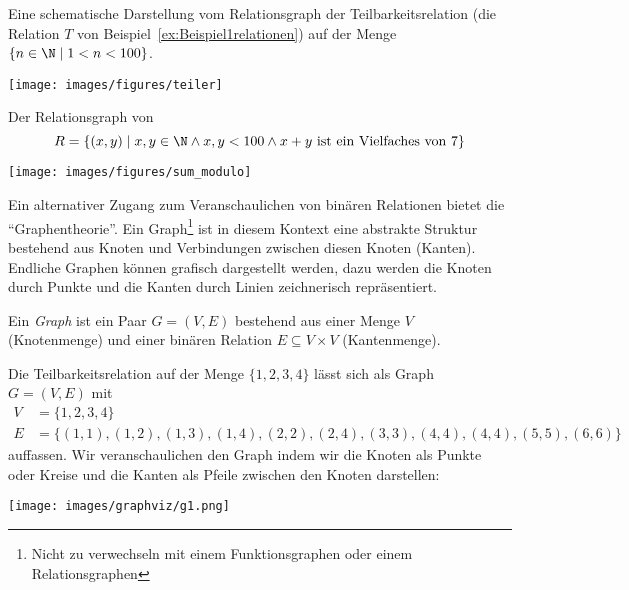 \begin{bsp}
Eine schematische Darstellung vom Relationsgraph der Teilbarkeitsrelation (die Relation
$T$ von Beispiel~\ref{ex:Beispiel1relationen}) auf der Menge $\{n\in\N\mid 1<n<100 \}$.
\begin{center}
\texttt{[image: images/figures/teiler]}
\end{center}
Der Relationsgraph von
\[
R=\{(x,y)\mid x,y\in\N\land x,y<100\land x+y\text{ ist ein Vielfaches von }7 \}
\]
\begin{center}
\texttt{[image: images/figures/sum\_modulo]}
\end{center}
\end{bsp}

Ein alternativer Zugang zum Veranschaulichen von binären Relationen bietet die ``Graphentheorie''. Ein Graph\footnote{Nicht zu verwechseln mit einem Funktionsgraphen oder einem
Relationsgraphen} ist in diesem Kontext eine abstrakte Struktur bestehend aus Knoten und Verbindungen zwischen diesen Knoten (Kanten). Endliche Graphen können grafisch dargestellt werden, dazu werden die Knoten durch Punkte und die Kanten durch Linien zeichnerisch repräsentiert.

\begin{df}
    Ein \textit{Graph} ist ein Paar $G=(V,E)$ bestehend aus einer Menge $V$ (Knotenmenge)
    und einer binären Relation $E\subseteq V\times V$ (Kantenmenge).
\end{df}

\begin{bsp}
    Die Teilbarkeitsrelation auf der Menge $\{1,2,3,4\}$ lässt sich als Graph
    $G=(V,E)$ mit
    \begin{align*}
    V &= \{1,2,3,4\}\\
    E &= \{(1,1),(1,2),(1,3),(1,4),(2,2),(2,4),(3,3),(4,4),
    (4,4),(5,5),(6,6)\}
    \end{align*}
    auffassen. Wir veranschaulichen den Graph indem wir die Knoten als Punkte oder Kreise
    und die Kanten als Pfeile zwischen den Knoten darstellen:

    \begin{center}
            \texttt{[image: images/graphviz/g1.png]}
    \end{center}


\end{bsp}

